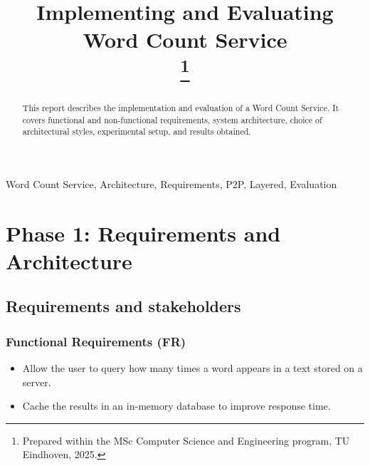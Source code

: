 \documentclass[conference]{IEEEtran}
\begin{document}
\title{Implementing and Evaluating Word Count Service\\
\thanks{Prepared within the MSc Computer Science and Engineering program, TU Eindhoven, 2025.}
}

\author{
\and
{}
}


\maketitle


\begin{abstract}
This report describes the implementation and evaluation of a Word Count Service. It covers functional and non-functional requirements, system architecture, choice of architectural styles, experimental setup, and results obtained.
\end{abstract}

\begin{IEEEkeywords}
Word Count Service, Architecture, Requirements, P2P, Layered, Evaluation
\end{IEEEkeywords}

\section{Phase 1: Requirements and Architecture}

\subsection{Requirements and stakeholders}
\subsubsection{Functional Requirements (FR)}
\begin{itemize}
    \item Allow the user to query how many times a word appears in a text stored on a server.
    \item Cache the results in an in-memory database to improve response time.
\end{itemize}
\end{document}
